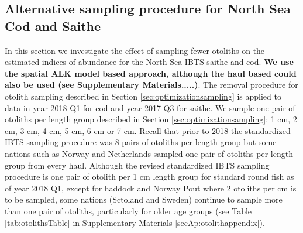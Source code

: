 \documentclass[a4paper 12pt]{article}
\numberwithin{equation}{section}
\begin{document}
{\subsection{Alternative sampling procedure for North Sea Cod and Saithe}
\label{sec:optimumeffortresults}

In this section we investigate the effect of sampling fewer otoliths on the estimated indices of abundance for the North Sea IBTS saithe and cod. {\bf We use the spatial ALK model based approach, although the haul based could also be used (see Supplementary Materials.....)}. The removal procedure for otolith sampling described in Section \ref{sec:optimizationsampling} is applied to data in year 2018 Q1 for cod and year 2017 Q3 for saithe. We sample one pair of otoliths per length group described in Section \ref{sec:optimizationsampling}: 1 cm, 2 cm, 3 cm, 4 cm, 5 cm, 6 cm or 7 cm. Recall that prior to 2018 the standardized IBTS sampling procedure was 8 pairs of otoliths per length group but some nations such as Norway and Netherlands sampled one pair of otoliths per length group from every haul. Although the revised standardized IBTS sampling procedure is one pair of otolith per 1 cm length group for standard round fish as of year 2018 Q1, except for haddock and Norway Pout where 2 otoliths per cm is to be sampled, some nations (Sctoland and Sweden) continue to sample more than one pair of otoliths, particularly for older age groups (see Table \ref{tab:otolithsTable} in Supplementary Materials \ref{secAp:otolithappendix}).

}
\end{document}
